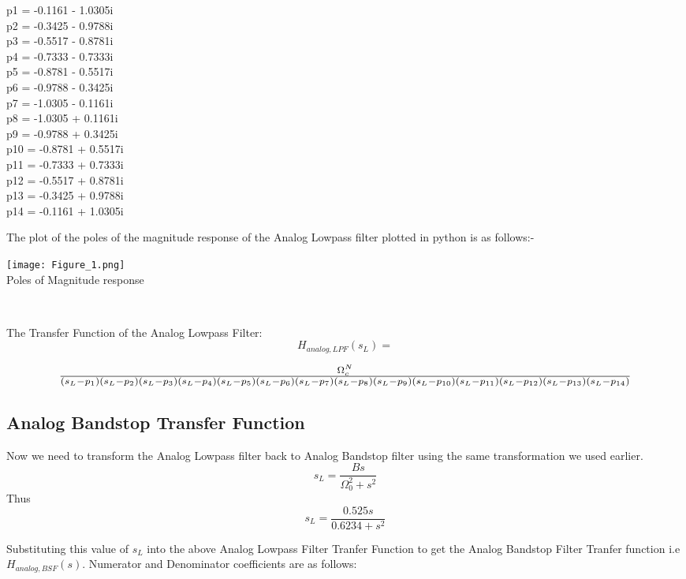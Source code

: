 \documentclass{article}
\begin{document}
\begin{center}
 p1 = -0.1161 - 1.0305i\\
 p2 = -0.3425 - 0.9788i\\
 p3 = -0.5517 - 0.8781i \\
 p4 = -0.7333 - 0.7333i \\
 p5 = -0.8781 - 0.5517i\\
 p6 = -0.9788 - 0.3425i\\
 p7 = -1.0305 - 0.1161i\\
 p8 = -1.0305 + 0.1161i\\
 p9 = -0.9788 + 0.3425i\\
 p10 = -0.8781 + 0.5517i\\
 p11 = -0.7333 + 0.7333i\\
 p12 = -0.5517 + 0.8781i \\
 p13 = -0.3425 + 0.9788i \\
 p14 = -0.1161 + 1.0305i\\

\end{center}
The plot of the poles of the magnitude response of the Analog Lowpass filter plotted in python is as follows:-

\newpage
\begin{center}
     \texttt{[image: Figure\_1.png]}\\
    \caption{Poles of Magnitude response}\\
\end{center}
   
The Transfer Function of the Analog Lowpass Filter:\\

\[H_{analog,LPF}(s_{L}) = \]

\[\scalebox{1.2}{$\frac{\Omega_{c}^N}{(s_{L}-p_{1})(s_{L}-p_{2})(s_{L}-p_{3})(s_{L}-p_{4})(s_{L}-p_{5})(s_{L}-p_{6})(s_{L}-p_{7})(s_{L}-p_{8})(s_{L}-p_{9})(s_{L}-p_{10})(s_{L}-p_{11})(s_{L}-p_{12})(s_{L}-p_{13})(s_{L}-p_{14})}$}\]

 \subsection{Analog Bandstop Transfer Function}

Now we need to transform the Analog Lowpass filter back to Analog Bandstop filter using the same transformation we used earlier.
\[s_{L} = \frac{Bs}{\Omega_{0}^2 + s^2}\]
Thus
\[s_{L} = \frac{0.525s}{0.6234 + s^2}\]

Substituting this value of $s_{L}$ into the above Analog Lowpass Filter Tranfer Function to get the Analog Bandstop Filter Tranfer function i.e \textbf{$H_{analog,BSF}(s)$}. Numerator and Denominator coefficients are as follows:
\end{document}
